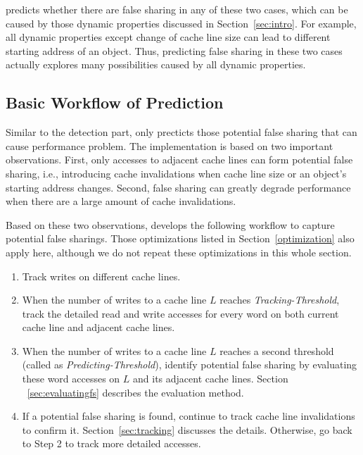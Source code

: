  predicts whether there are false sharing 
in any of these two cases, which can
be caused by those dynamic properties discussed in Section~\ref{sec:intro}.
For example, all dynamic properties except change of cache line size 
can lead to different starting address of an object. 
Thus, predicting false sharing in these two cases actually 
explores many possibilities caused by all dynamic properties.

\subsection{Basic Workflow of Prediction}
\label{sec:predictionmechanism} 

Similar to the detection part, 
 only precticts those potential false sharing that can 
cause performance problem.
The implementation is based on
two important observations. First, only accesses to 
adjacent cache lines can form potential false sharing, 
i.e., introducing cache invalidations when cache line size
or an object's starting address changes.
Second, false sharing can greatly degrade performance when 
there are a large amount of cache invalidations.

Based on these two observations,  develops 
the following workflow to capture potential false sharings.
Those optimizations listed in Section~\ref{optimization} also apply
here, although we do not repeat these optimizations in
this whole section.

\begin{enumerate}
\item
Track writes on different cache lines. 

\item
When the number of writes to a cache line $L$ reaches {\it Tracking-Threshold},
track the detailed read and write accesses for every word on both current cache line 
and adjacent cache lines. 

\item
When the number of writes to a cache line $L$ reaches a second threshold (called as
{\it Predicting-Threshold}), 
identify potential false sharing by evaluating these word accesses on $L$ and 
its adjacent cache lines. Section ~\ref{sec:evaluatingfs} describes the evaluation method.

\item
If a potential false sharing is found, continue to track cache line invalidations
to confirm it. Section~\ref{sec:tracking} discusses the details.
Otherwise, go back to Step 2 to track more detailed accesses.
 
\end{enumerate}

